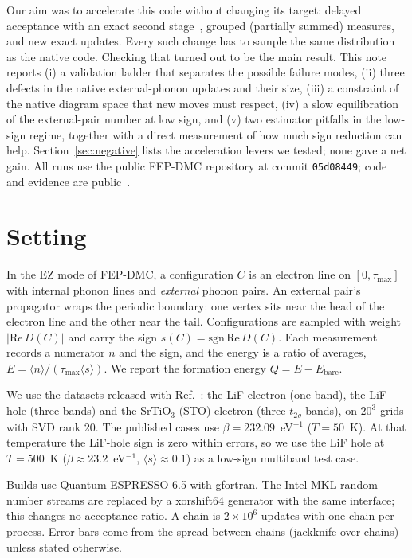 \documentclass[aps,prb,reprint,superscriptaddress,nofootinbib]{revtex4-2}
\newcommand{\avg}[1]{\langle #1\rangle}
\newcommand{\code}[1]{\texttt{#1}}
\begin{document}
Our aim was to accelerate this code without changing its target: delayed acceptance with an exact second stage~\cite{ChristenFox2005}, grouped (partially summed) measures, and new exact updates. Every such change has to sample the same distribution as the native code. Checking that turned out to be the main result. This note reports
(i) a validation ladder that separates the possible failure modes,
(ii) three defects in the native external-phonon updates and their size,
(iii) a constraint of the native diagram space that new moves must respect,
(iv) a slow equilibration of the external-pair number at low sign, and
(v) two estimator pitfalls in the low-sign regime, together with a direct measurement of how much sign reduction can help.
Section~\ref{sec:negative} lists the acceleration levers we tested; none gave a net gain. All runs use the public FEP-DMC repository at commit \code{05d08449}; code and evidence are public~\cite{FutureB}.

\section{Setting}

In the EZ mode of FEP-DMC, a configuration $C$ is an electron line on $[0,\tau_{\max}]$ with internal phonon lines and \emph{external} phonon pairs. An external pair's propagator wraps the periodic boundary: one vertex sits near the head of the electron line and the other near the tail. Configurations are sampled with weight $|\mathrm{Re}\,D(C)|$ and carry the sign $s(C)=\mathrm{sgn}\,\mathrm{Re}\,D(C)$. Each measurement records a numerator $n$ and the sign, and the energy is a ratio of averages, $E=\avg{n}/(\tau_{\max}\avg{s})$. We report the formation energy $Q=E-E_{\mathrm{bare}}$.

We use the datasets released with Ref.~: the LiF electron (one band), the LiF hole (three bands) and the SrTiO$_3$ (STO) electron (three $t_{2g}$ bands), on $20^3$ grids with SVD rank 20. The published cases use $\beta=232.09$~eV$^{-1}$ ($T=50$~K). At that temperature the LiF-hole sign is zero within errors, so we use the LiF hole at $T=500$~K ($\beta\approx23.2$~eV$^{-1}$, $\avg{s}\approx0.1$) as a low-sign multiband test case.

Builds use Quantum ESPRESSO 6.5 with gfortran. The Intel MKL random-number streams are replaced by a xorshift64 generator with the same interface; this changes no acceptance ratio. A chain is $2\times10^6$ updates with one chain per process. Error bars come from the spread between chains (jackknife over chains) unless stated otherwise.
\end{document}

